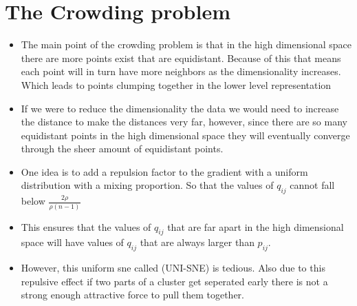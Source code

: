 \documentclass[11pt]{article}
\begin{document}
\section{The Crowding problem}
\label{sec:orga910985}
\begin{itemize}
\item The main point of the crowding problem is that in the high dimensional space there are more points exist that are equidistant. Because of this that means each point will in turn have more neighbors as the dimensionality increases. Which leads to points clumping together in the lower level representation
\item If we were to reduce the dimensionality the data we would need to increase the distance to make the distances very far, however, since there are so many equidistant points in the high dimensional space they will eventually converge through the sheer amount of equidistant points.
\item One idea is to add a repulsion factor to the gradient with a uniform distribution with a mixing proportion. So that the values of \(q_{ij}\) cannot fall below \(\frac{2\rho}{\rho (n-1)}\)
\item This ensures that the values of \(q_{ij}\) that are far apart in the high dimensional space will have values of \(q_{ij}\) that are always larger than \(p_{ij}\).
\item However, this uniform sne called (UNI-SNE) is tedious. Also due to this repulsive effect if two parts of a cluster get seperated early there is not a strong enough attractive force to pull them together.
\end{itemize}
\end{document}

